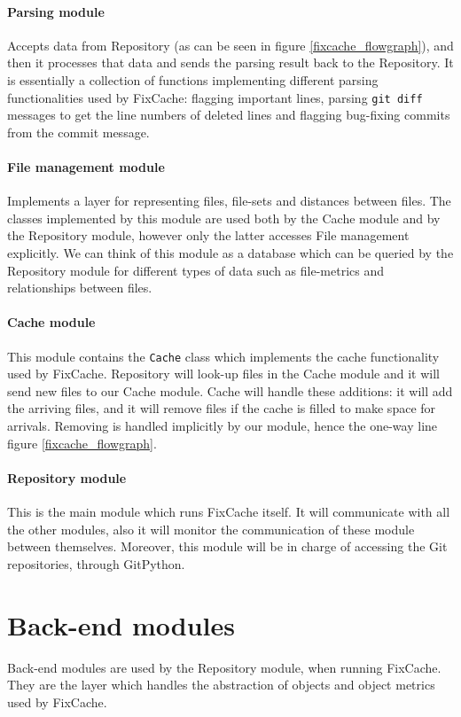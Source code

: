 \documentclass[12pt,twoside,notitlepage]{report}
\newcommand{\fxch}{FixCache}
\begin{document}
\paragraph{Parsing module}Accepts data from Repository (as can be seen in figure \ref{fixcache_flowgraph}), and then it processes that data and sends the parsing result back to the Repository. It is essentially a collection of functions implementing different parsing functionalities used by \fxch{}: flagging important lines, parsing \texttt{git diff} messages to get the line numbers of deleted lines and flagging bug-fixing commits from the commit message.

\paragraph{File management module}Implements a layer for representing files, file-sets and distances between files. The classes implemented by this module are used both by the Cache module and by the Repository module, however only the latter accesses File management explicitly. We can think of this module as a database which can be queried by the Repository module for different types of data such as file-metrics and relationships between files.

\paragraph{Cache module}This module contains the \texttt{Cache} class which implements the cache functionality used by \fxch{}. Repository will look-up files in the Cache module and it will send new files to our Cache module. Cache will handle these additions: it will add the arriving files, and it will remove files if the cache is filled to make space for arrivals. Removing is handled implicitly by our module, hence the one-way line figure \ref{fixcache_flowgraph}.

\paragraph{Repository module}This is the main module which runs \fxch{} itself. It will communicate with all the other modules, also it will monitor the communication of these module between themselves. Moreover, this module will be in charge of accessing the Git repositories, through GitPython.
\section{Back-end modules} Back-end modules are used by the Repository module, when running \fxch{}. They are the layer which handles the abstraction of objects and object metrics used by \fxch{}.
\end{document}
